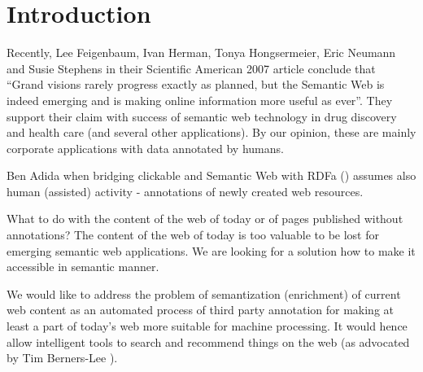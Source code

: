 \documentclass{www2009-submission}
\begin{document}


\section{Introduction}



Recently, Lee Feigenbaum, Ivan Herman, Tonya Hongsermeier, Eric Neumann and Susie Stephens in their Scientific American 2007 article \cite{biblio:feigenbaum_semantic_2007} conclude that ``Grand visions rarely progress exactly as planned, but the Semantic Web is indeed emerging and is making online information more useful as ever''. They support their claim with success of semantic web technology in drug discovery and health care (and several other applications). By our opinion, these are mainly corporate applications with data annotated by humans.

Ben Adida when bridging clickable and Semantic Web with RDFa (\cite{biblio:AdidaClickable}) assumes also human (assisted) activity - annotations of newly created web resources. \par

What to do with the content of the web of today or of pages published without annotations? The content of the web of today is too valuable to be lost for emerging semantic web applications. We are looking for a solution how to make it accessible in semantic manner. \par

We would like to address the problem of semantization (enrichment) of current web content as an automated process of third party annotation for making at least a part of today's web more suitable for machine processing. It would hence allow intelligent tools to search and recommend things on the web (as advocated by Tim Berners-Lee \cite{biblio:LeeWebThings}). \par
\end{document}
